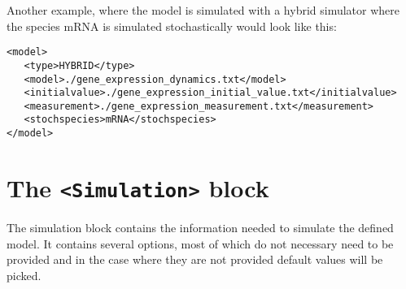 \documentclass[11pt]{article} %
\begin{document}
Another example, where the model is simulated with a hybrid simulator where the species mRNA is simulated stochastically would look like this: 

\begin{tcolorbox}
\begin{verbatim}
<model>
   <type>HYBRID</type>
   <model>./gene_expression_dynamics.txt</model>
   <initialvalue>./gene_expression_initial_value.txt</initialvalue>
   <measurement>./gene_expression_measurement.txt</measurement>
   <stochspecies>mRNA</stochspecies>
</model>
\end{verbatim}
\end{tcolorbox}

\section{The \texttt{<Simulation>} block}
The simulation block contains the information needed to simulate the defined model. It contains several options, most of which do not necessary need to be provided and in the case where they are not provided default values will be picked.  
\end{document}

